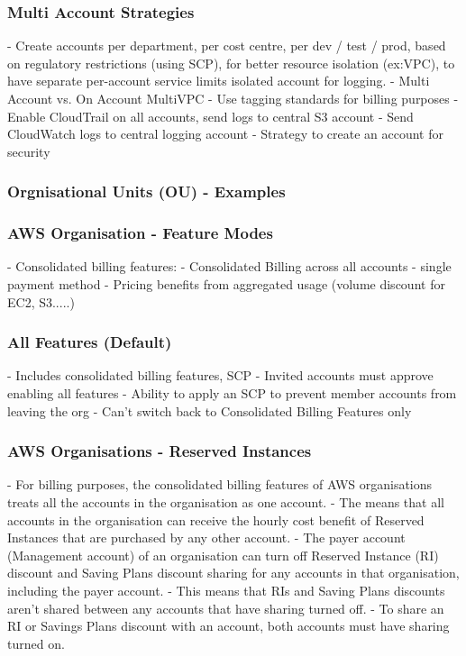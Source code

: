 \documentclass[11pt]{book}
\begin{document}
    \subsubsection{Multi Account Strategies}
    - Create accounts per department, per cost centre, per dev / test / prod, based on regulatory restrictions (using SCP), for better resource isolation (ex:VPC), to have separate per-account service limits isolated account for logging.
    - Multi Account vs. On Account MultiVPC
    - Use tagging standards for billing purposes
    - Enable CloudTrail on all accounts, send logs to central S3 account
    - Send CloudWatch logs to central logging account
    - Strategy to create an account for security

    \subsubsection{Orgnisational Units (OU) - Examples}

    \subsubsection{AWS Organisation - Feature Modes}
    - Consolidated billing features:
    - Consolidated Billing across all accounts - single payment method
    - Pricing benefits from aggregated usage (volume discount for EC2, S3.....)

    \subsubsection{All Features (Default)}
    - Includes consolidated billing features, SCP
    - Invited accounts must approve enabling all features
    - Ability to apply an SCP to prevent member accounts from leaving the org
    - Can't switch back to Consolidated Billing Features only

    \subsubsection{AWS Organisations - Reserved Instances}
    - For billing purposes, the consolidated billing features of AWS organisations treats all the accounts in the organisation as one account.
    - The means that all accounts in the organisation can receive the hourly cost benefit of Reserved Instances that are purchased by any other account.
    - The payer account (Management account) of an organisation can turn off Reserved Instance (RI) discount and Saving Plans discount sharing for any accounts in that organisation, including the payer account.
    - This means that RIs and Saving Plans discounts aren't shared between any accounts that have sharing turned off.
    - To share an RI or Savings Plans discount with an account, both accounts must have sharing turned on.
\end{document}
